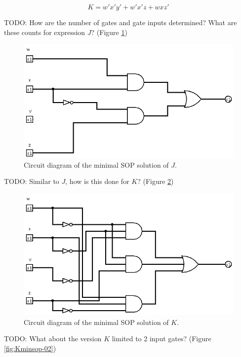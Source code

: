 \documentclass[12pt]{article}
\begin{document}
\begin{equation}
	K = w'x'y' + w'x'z + wxz'  \label{eq:Ksop}
\end{equation}

TODO: How are the number of gates and gate inputs determined?
What are these counts for expression $J$?
(Figure \ref{fig:Jminsop-01})

\begin{figure}[htb]
\center
\includegraphics[scale=0.5]{Jminsop-01}
\caption{Circuit diagram of the minimal SOP solution of $J$.}
\label{fig:Jminsop-01}
\end{figure}

TODO: Similar to $J$, how is this done for $K$?
(Figure \ref{fig:Kminsop-01})

\begin{figure}[!htb]
\center
\includegraphics[scale=0.5]{Kminsop-01}
\caption{Circuit diagram of the minimal SOP solution of $K$.}
\label{fig:Kminsop-01}
\end{figure}

TODO: What about the version $K$ limited to 2 input gates?
(Figure \ref{fig:Kminsop-02})
\end{document}
